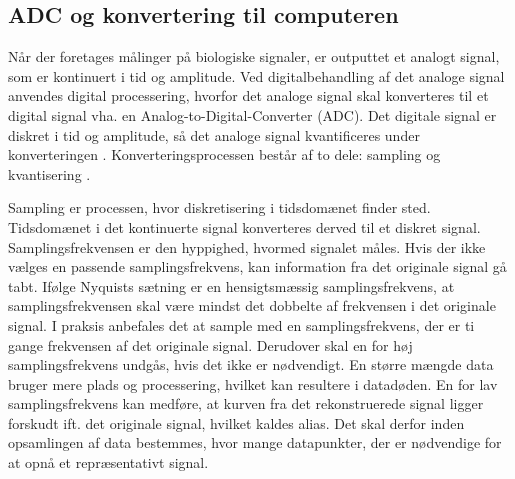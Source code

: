 \subsection{ADC og konvertering til computeren}\label{ADCafsnit}
Når der foretages målinger på biologiske signaler, er outputtet et analogt signal, som er kontinuert i tid og amplitude. Ved digitalbehandling af det analoge signal anvendes digital processering, hvorfor det analoge signal skal konverteres til et digital signal vha. en Analog-to-Digital-Converter (ADC). Det digitale signal er diskret i tid og amplitude, så det analoge signal kvantificeres under konverteringen \cite{webster2009}. Konverteringsprocessen består af to dele: sampling og kvantisering  \cite{Zouridakis2003}.  

Sampling er processen, hvor diskretisering i tidsdomænet finder sted. Tidsdomænet i det kontinuerte signal konverteres derved til et diskret signal. Samplingsfrekvensen er den hyppighed, hvormed signalet måles. Hvis der ikke vælges en passende samplingsfrekvens, kan information fra det originale signal gå tabt. Ifølge Nyquists sætning er en hensigtsmæssig samplingsfrekvens, at samplingsfrekvensen skal være mindst det dobbelte af frekvensen i det originale signal. \cite{Zouridakis2003} I praksis anbefales det at sample med en samplingsfrekvens, der er ti gange frekvensen af det originale signal. Derudover skal en for høj samplingsfrekvens undgås, hvis det ikke er nødvendigt. En større mængde data bruger mere plads og processering, hvilket kan resultere i datadøden. \cite{Wolf2004,Aminoff2012} En for lav samplingsfrekvens kan medføre, at kurven fra det rekonstruerede signal ligger forskudt ift. det originale signal, hvilket kaldes alias. \cite{Zouridakis2003} Det skal derfor inden opsamlingen af data bestemmes, hvor mange datapunkter, der er nødvendige for at opnå et repræsentativt signal.

